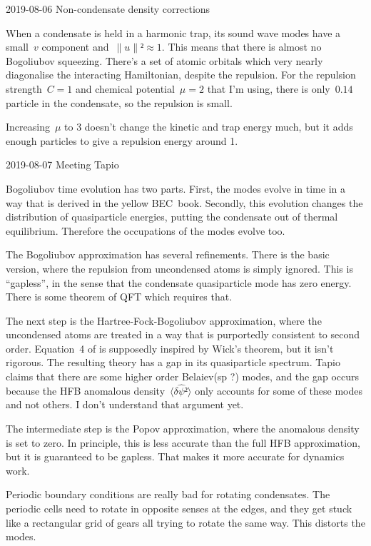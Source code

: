 2019-08-06 Non-condensate density corrections

When a condensate is held in a harmonic trap, its sound wave modes have a small~$v$ component and~$∥u∥²≈1$.  This means that there is almost no Bogoliubov squeezing.  There's a set of atomic orbitals which very nearly diagonalise the interacting Hamiltonian, despite the repulsion.  For the repulsion strength~$C=1$ and chemical potential~$μ=2$ that I'm using, there is only~$0.14$ particle in the condensate, so the repulsion is small.

Increasing~$μ$ to 3 doesn't change the kinetic and trap energy much, but it adds enough particles to give a repulsion energy around 1.

2019-08-07 Meeting Tapio

Bogoliubov time evolution has two parts.  First, the modes evolve in time in a way that is derived in the yellow BEC\ book.  Secondly, this evolution changes the distribution of quasiparticle energies, putting the condensate out of thermal equilibrium.  Therefore the occupations of the modes evolve too.

The Bogoliubov approximation has several refinements.  There is the basic version, where the repulsion from uncondensed atoms is simply ignored.  This is “gapless”, in the sense that the condensate quasiparticle mode has zero energy.  There is some theorem of QFT which requires that.

The next step is the Hartree-Fock-Bogoliubov approximation, where the uncondensed atoms are treated in a way that is purportedly consistent to second order.  Equation~4 of \cite{prb-53-9341} is supposedly inspired by Wick's theorem, but it isn't rigorous.  The resulting theory has a gap in its quasiparticle spectrum.  Tapio claims that there are some higher order Belaiev(sp ?) modes, and the gap occurs because the HFB anomalous density~$〈δ\hat ψ²〉$ only accounts for some of these modes and not others.  I don't understand that argument yet.

The intermediate step is the Popov approximation, where the anomalous density is set to zero.  In principle, this is less accurate than the full HFB approximation, but it is guaranteed to be gapless.  That makes it more accurate for dynamics work.

Periodic boundary conditions are really bad for rotating condensates.  The periodic cells need to rotate in opposite senses at the edges, and they get stuck like a rectangular grid of gears all trying to rotate the same way.  This distorts the modes.

